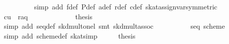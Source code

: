 \begin{isabellebody}
\ \ \ \ \ \ \ \ \isamarkupfalse%
\ {}simp\ add{}\ f{}def\ P{}def\ a{}def\ r{}def\ c{}def\ skat{}assign{}{}var{}symmetric{}{}\isanewline
\ \ \ \ \ \ \isamarkupfalse%
\ \isamarkupfalse%
\ {}c{}{}u{}{}{}\ {}\ r{}{}{}a{}{}q{}{}{}{}\ \isamarkupfalse%
\isanewline
\ \ \ \ \isamarkupfalse%
\isanewline
\ \ \ \ \isamarkupfalse%
\ \isamarkupfalse%
\ {}{}thesis{}\isanewline
\ \ \ \ \ \ \isamarkupfalse%
\ {}simp\ add{}\ seq{}def\ skd{}mult{}onel{}\ {}smt\ skd{}mult{}assoc{}\isanewline
\ \ \isamarkupfalse%
\isanewline
\isanewline
\ \ \isamarkupfalse%
\ \isamarkupfalse%
\ {}{}{}{}\ {}\ seq\ scheme{}{}\isanewline
\ \ \ \ \isamarkupfalse%
\ {}simp\ add{}\ scheme{}{}def{}\ skat{}simp\isanewline
\isanewline
\ \ \isamarkupfalse%
\ \isamarkupfalse%
\ {}thesis\ \isamarkupfalse%
\isanewline
{}\isamarkupfalse%
%
\endisatagproof
{\isafoldproof}%
%
\isadelimproof
\isanewline
%
\endisadelimproof
%
\isadelimtheory
\isanewline
%
\endisadelimtheory
%
\isatagtheory
{}\isamarkupfalse%
%
\endisatagtheory
{\isafoldtheory}%
%
\isadelimtheory
\isanewline
%
\endisadelimtheory
\end{isabellebody}%
